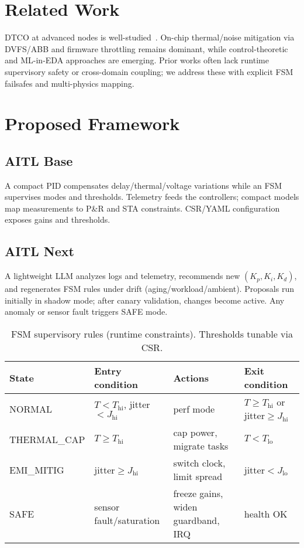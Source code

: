 \documentclass[conference]{IEEEtran}
\begin{document}
\section{Related Work}
DTCO at advanced nodes is well-studied~\cite{yakimets,irds}. On-chip thermal/noise mitigation via DVFS/ABB and firmware throttling remains dominant, while control-theoretic and ML-in-EDA approaches are emerging. Prior works often lack runtime supervisory safety or cross-domain coupling; we address these with explicit FSM failsafes and multi-physics mapping.

\section{Proposed Framework}
\subsection{AITL Base}
A compact PID compensates delay/thermal/voltage variations while an FSM supervises modes and thresholds. Telemetry feeds the controllers; compact models map measurements to P\&R and STA constraints. CSR/YAML configuration exposes gains and thresholds.

\subsection{AITL Next}
A lightweight LLM analyzes logs and telemetry, recommends new $(K_p,K_i,K_d)$, and regenerates FSM rules under drift (aging/workload/ambient). Proposals run initially in shadow mode; after canary validation, changes become active. Any anomaly or sensor fault triggers SAFE mode.

\begin{table}[t]
\centering
\caption{FSM supervisory rules (runtime constraints). Thresholds tunable via CSR.}
\label{tab:fsm}
\begin{tabular}{@{}llll@{}}
\toprule
State & Entry condition & Actions & Exit condition \\
\midrule
NORMAL & $T<T_\mathrm{hi}$, jitter$<J_\mathrm{hi}$ &
perf mode & $T\ge T_\mathrm{hi}$ or jitter$\ge J_\mathrm{hi}$ \\
THERMAL\_CAP & $T\ge T_\mathrm{hi}$ &
cap power, migrate tasks & $T<T_\mathrm{lo}$ \\
EMI\_MITIG & jitter$\ge J_\mathrm{hi}$ &
switch clock, limit spread & jitter$<J_\mathrm{lo}$ \\
SAFE & sensor fault/saturation &
freeze gains, widen guardband, IRQ & health OK \\
\bottomrule
\end{tabular}
\end{table}
\end{document}
